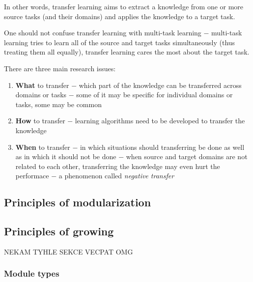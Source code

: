 \documentclass[a4paper,twocolumn]{article}
\begin{document}
In other words, transfer learning aims to extract a knowledge from one or more source tasks (and their domains) and applies the knowledge to a target task.

One should not confuse transfer learning with multi-task learning $-$ multi-task learning tries to learn all of the source and target tasks simultaneously (thus treating them all equally), transfer learning cares the most about the target task.

There are three main research issues:
\begin{enumerate}
    \item \textbf{What} to transfer $-$ which part of the knowledge can be transferred across domains or tasks $-$ some of it may be specific for individual domains or tasks, some may be common
    \item \textbf{How} to transfer $-$ learning algorithms need to be developed to transfer the knowledge
    \item \textbf{When} to transfer $-$ in which situations should transferring be done as well as in which it should not be done $-$ when source and target domains are not related to each other, transferring the knowledge may even hurt the performace $-$ a phenomenon called \textit{negative transfer}
\end{enumerate}



\subsection*{Principles of modularization}
\subsection*{Principles of growing}
NEKAM TYHLE SEKCE VECPAT OMG
\subsubsection*{Module types}
\end{document}
